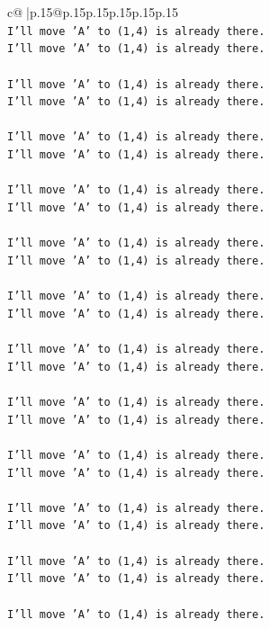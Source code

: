 \documentclass{article}
\begin{document}
{\begin{supertabular}{c@{$\;$}|p{.15\linewidth}@{}p{.15\linewidth}p{.15\linewidth}p{.15\linewidth}p{.15\linewidth}p{.15\linewidth}}
{{{\\ 
\texttt{I'll move 'A' to (1,4) is already there.} \\
\texttt{I'll move 'A' to (1,4) is already there.} \\
\\ 
\texttt{I'll move 'A' to (1,4) is already there.} \\
\texttt{I'll move 'A' to (1,4) is already there.} \\
\\ 
\texttt{I'll move 'A' to (1,4) is already there.} \\
\texttt{I'll move 'A' to (1,4) is already there.} \\
\\ 
\texttt{I'll move 'A' to (1,4) is already there.} \\
\texttt{I'll move 'A' to (1,4) is already there.} \\
\\ 
\texttt{I'll move 'A' to (1,4) is already there.} \\
\texttt{I'll move 'A' to (1,4) is already there.} \\
\\ 
\texttt{I'll move 'A' to (1,4) is already there.} \\
\texttt{I'll move 'A' to (1,4) is already there.} \\
\\ 
\texttt{I'll move 'A' to (1,4) is already there.} \\
\texttt{I'll move 'A' to (1,4) is already there.} \\
\\ 
\texttt{I'll move 'A' to (1,4) is already there.} \\
\texttt{I'll move 'A' to (1,4) is already there.} \\
\\ 
\texttt{I'll move 'A' to (1,4) is already there.} \\
\texttt{I'll move 'A' to (1,4) is already there.} \\
\\ 
\texttt{I'll move 'A' to (1,4) is already there.} \\
\texttt{I'll move 'A' to (1,4) is already there.} \\
\\ 
\texttt{I'll move 'A' to (1,4) is already there.} \\
\texttt{I'll move 'A' to (1,4) is already there.} \\
\\ 
\texttt{I'll move 'A' to (1,4) is already there.} \\
}}}
\end{supertabular}}
\end{document}
